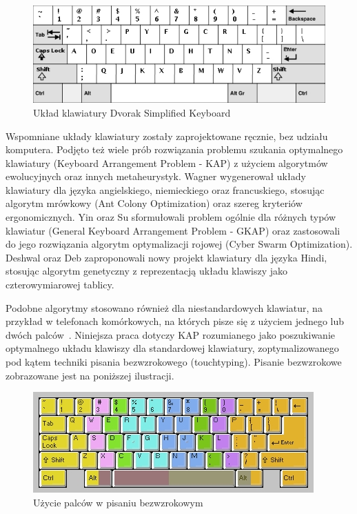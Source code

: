 \documentclass{xmgr}
\begin{document}
\begin{figure}[!tbh]
\centering
\includegraphics[width=.8\hsize]{fig/dvorak}
\caption{Układ klawiatury Dvorak Simplified Keyboard}
\end{figure}

Wspomniane układy klawiatury zostały zaprojektowane ręcznie, bez udziału komputera. Podjęto też wiele prób rozwiązania problemu szukania optymalnego klawiatury (Keyboard Arrangement Problem - KAP) z użyciem algorytmów ewolucyjnych oraz innych metaheurystyk. Wagner \cite{Eggers2003672} wygenerował układy klawiatury dla języka angielskiego, niemieckiego oraz francuskiego, stosując algorytm mrówkowy (Ant Colony Optimization) oraz szereg kryteriów ergonomicznych. Yin oraz Su \cite{Yin201143} sformułowali problem ogólnie dla różnych typów klawiatur (General Keyboard Arrangement Problem - GKAP) oraz zastosowali do jego rozwiązania algorytm optymalizacji rojowej (Cyber Swarm Optimization). Deshwal oraz Deb \cite{Hindi} zaproponowali nowy projekt klawiatury dla języka Hindi, stosując algorytm genetyczny z reprezentacją układu klawiszy jako czterowymiarowej tablicy.

Podobne algorytmy stosowano również dla niestandardowych klawiatur, na przykład w telefonach komórkowych, na których pisze się z użyciem jednego lub dwóch palców~\cite{Li2006695}. Niniejsza praca dotyczy KAP rozumianego jako poszukiwanie optymalnego układu klawiszy dla standardowej klawiatury, zoptymalizowanego pod kątem techniki pisania bezwzrokowego (touchtyping). Pisanie bezwzrokowe zobrazowane jest na poniższej ilustracji.

\begin{figure}[!tbh]
\centering
\includegraphics[width=.8\hsize]{fig/touchtyping}
\caption{Użycie palców w pisaniu bezwzrokowym}
\end{figure}
\end{document}
